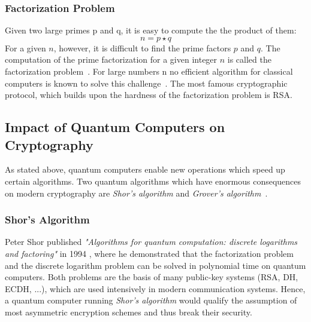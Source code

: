\subsubsection{Factorization Problem}

Given two large primes p and q, it is easy to compute the the product of them:
\begin{equation*}
n = p \star q
\end{equation*}
For a given $n$, however, it is difficult to find the prime factors $p$ and $q$. The computation of the prime factorization for a given integer $n$ is called the factorization problem~\parencite{ITSicherheit}. For large numbers n no efficient algorithm for classical computers is known to solve this challenge~\parencite{ITSicherheit}. The most famous cryptographic protocol, which builds upon the hardness of the factorization problem is RSA.

\subsection{Impact of Quantum Computers on Cryptography}

As stated above, quantum computers enable new operations which speed up certain algorithms. Two quantum algorithms which have enormous consequences on modern cryptography are \textit{Shor's algorithm} and \textit{Grover's algorithm}~\parencite{nielsen2002quantum}.

\subsubsection{Shor's Algorithm}
Peter Shor published \textit{"Algorithms for quantum computation: discrete logarithms and factoring"} in 1994 \parencite{shor1994algorithms}, where he demonstrated that the factorization problem and the discrete logarithm problem can be solved in polynomial time on quantum computers. Both problems are the basis of many public-key systems (RSA, DH, ECDH, ...), which are used intensively in modern communication systems. Hence, a quantum computer running \textit{Shor's algorithm} would qualify the assumption of most asymmetric encryption schemes and thus break their security.


